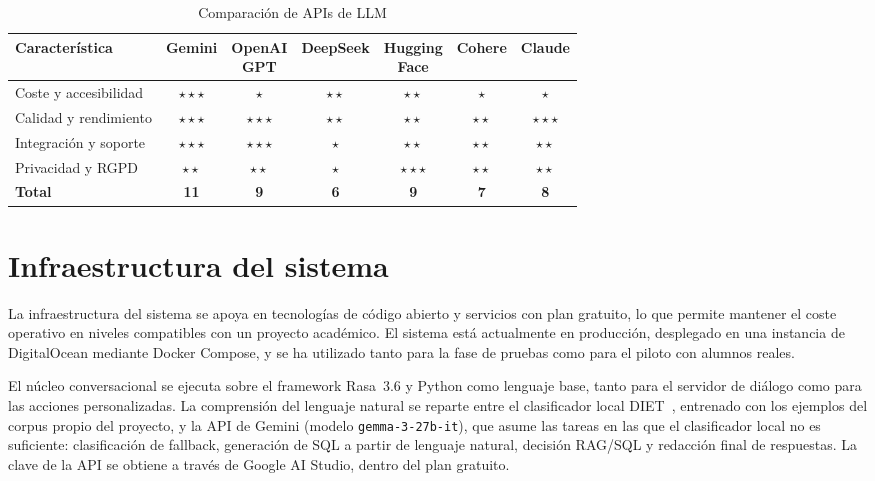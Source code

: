 \begin{table}[hbtp]
\centering
\small
\begin{tabular}{|p{4.0cm}|c|c|c|c|c|c|}
\hline
\textbf{Característica} & \textbf{Gemini} & \shortstack{\textbf{OpenAI}\\\textbf{GPT}} & \textbf{DeepSeek} & \shortstack{\textbf{Hugging}\\\textbf{Face}} & \textbf{Cohere} & \textbf{Claude} \\ \hline
Coste y accesibilidad    & $\star\star\star$ & $\star$         & $\star\star$      & $\star\star$                                  & $\star$         & $\star$         \\ \hline
Calidad y rendimiento    & $\star\star\star$ & $\star\star\star$ & $\star\star$     & $\star\star$                                  & $\star\star$    & $\star\star\star$ \\ \hline
Integración y soporte    & $\star\star\star$ & $\star\star\star$ & $\star$          & $\star\star$                                  & $\star\star$    & $\star\star$     \\ \hline
Privacidad y RGPD        & $\star\star$     & $\star\star$     & $\star$           & $\star\star\star$                             & $\star\star$    & $\star\star$     \\ \hline
\textbf{Total}           & \textbf{11}     & \textbf{9}      & \textbf{6}        & \textbf{9}                                   & \textbf{7}      & \textbf{8}      \\ \hline
\end{tabular}
\caption{Comparación de APIs de LLM}
\label{tab:llm}
\end{table}

\section{Infraestructura del sistema}
\label{sec:infraestructura}

La infraestructura del sistema se apoya en tecnologías de código abierto y servicios con plan gratuito, lo que permite mantener el coste operativo en niveles compatibles con un proyecto académico. El sistema está actualmente en producción, desplegado en una instancia de DigitalOcean mediante Docker Compose, y se ha utilizado tanto para la fase de pruebas como para el piloto con alumnos reales.

El núcleo conversacional se ejecuta sobre el framework Rasa~3.6 y Python como lenguaje base, tanto para el servidor de diálogo como para las acciones personalizadas. La comprensión del lenguaje natural se reparte entre el clasificador local DIET~\cite{bocklisch2020diet}, entrenado con los ejemplos del corpus propio del proyecto, y la API de Gemini (modelo \texttt{gemma-3-27b-it}), que asume las tareas en las que el clasificador local no es suficiente: clasificación de fallback, generación de SQL a partir de lenguaje natural, decisión RAG/SQL y redacción final de respuestas. La clave de la API se obtiene a través de Google AI Studio, dentro del plan gratuito.


